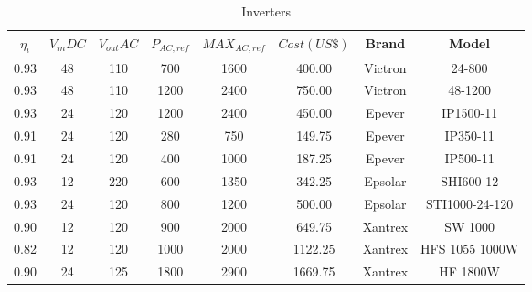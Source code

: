 \begin{table}
\caption{Inverters}\label{tab:inverter}
\begin{scriptsize}
\begin{tabular}{|c|c|c|c|c|c|c|c|}
\hline
\hline
$\eta_{i}$ & $V_{in}DC$  & $V_{out}AC$ & $P_{AC,ref}$  & $MAX_{AC,ref}$ & $Cost (US\$)$ & Brand & Model\\
\hline
\hline
0.93 & 48 & 110 & 700 & 1600 & 400.00 & Victron & 24-800 \\
\hline
0.93 & 48 & 110 & 1200 & 2400 & 750.00 & Victron & 48-1200 \\
\hline
0.93 & 24 & 120 & 1200 & 2400 & 450.00 & Epever & IP1500-11 \\
\hline
0.91 & 24 & 120 & 280 & 750 & 149.75 & Epever & IP350-11 \\
\hline
0.91 & 24 & 120 & 400 & 1000 & 187.25 & Epever &  IP500-11 \\
\hline
0.93 & 12 & 220 & 600 & 1350 & 342.25 & Epsolar & SHI600-12 \\
\hline
0.93 & 24 & 120 & 800 & 1200 & 500.00 & Epsolar & STI1000-24-120 \\
\hline
0.90 & 12 & 120 & 900 & 2000 & 649.75 & Xantrex & SW 1000 \\
\hline
0.82 & 12 & 120 & 1000 & 2000 & 1122.25 & Xantrex & HFS 1055 1000W \\
\hline
0.90 & 24 & 125 & 1800 & 2900 & 1669.75 & Xantrex & HF 1800W \\
\hline
\hline
\end{tabular}
\end{scriptsize}
\end{table}

